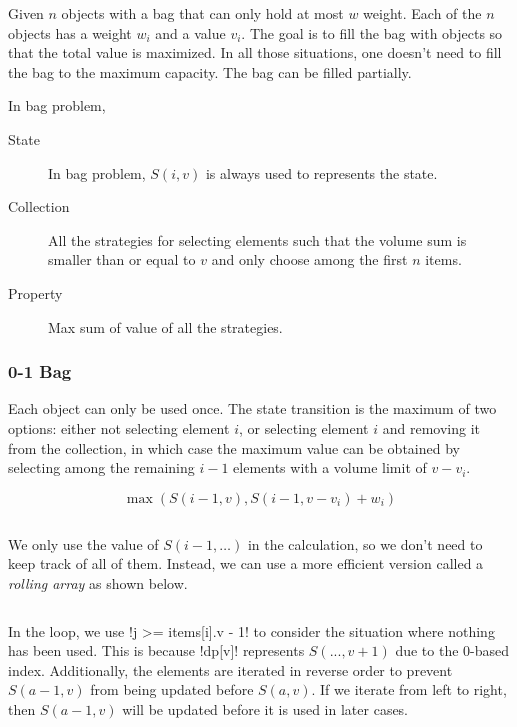 \documentclass{article}
\begin{document}
Given $n$ objects with a bag that can only hold at most $w$ weight. Each of the $n$ objects has a weight $w_i$ and a value $v_i$. The goal is to fill the bag with objects so that the total value is maximized. In all those situations, one doesn't need to fill the bag to the maximum capacity. The bag can be filled partially.

In bag problem,

\begin{description}
	\item[State] In bag problem, $S(i, v)$ is always used to represents the state.
	\item[Collection] All the strategies for selecting elements such that the volume sum is smaller than or equal to $v$ and only choose among the first $n$ items.
	\item[Property] Max sum of value of all the strategies.
\end{description}
\subsubsection{0-1 Bag}

Each object can only be used once. The state transition is the maximum of two options: either not selecting element $i$, or selecting element $i$ and removing it from the collection, in which case the maximum value can be obtained by selecting among the remaining $i - 1$ elements with a volume limit of $v - v_i$.

\[
	\max(S(i - 1, v), S(i - 1, v - v_i) + w_i)
\]

\begin{center}
	\inputminted{cpp}{src/struct-0-1-rudimentary-bag.cpp}%
\end{center}

We only use the value of $S(i - 1, \ldots)$ in the calculation, so we don't need to keep track of all of them. Instead, we can use a more efficient version called a \emph{rolling array} as shown below.

\begin{center}
	\inputminted[firstline=21, lastline=27]{cpp}{src/struct-0-1-bag.cpp}
\end{center}

In the loop, we use \mono!j >= items[i].v - 1! to consider the situation where nothing has been used. This is because \mono!dp[v]! represents $S(..., v + 1)$ due to the 0-based index. Additionally, the elements are iterated in reverse order to prevent $S(a-1,v)$ from being updated before $S(a,v)$. If we iterate from left to right, then $S(a-1,v)$ will be updated before it is used in later cases.
\end{document}
